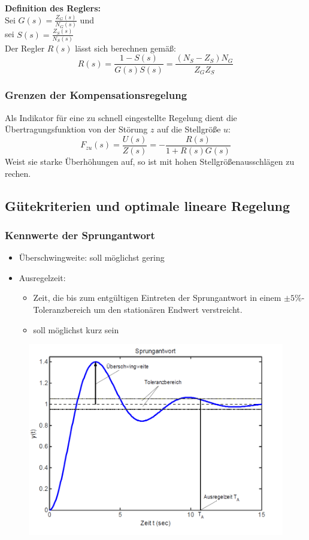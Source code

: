 \documentclass[10pt,a4paper]{article}
\begin{document}
\textbf{Definition des Reglers:} \\
Sei $G(s) = \frac{Z_G(s)}{N_G(s)}$ und \\
sei $S(s) = \frac{Z_S(s)}{N_S(s)}$ \\
Der Regler $R(s)$ lässt sich berechnen gemäß:
$$
	R(s) = \frac{1 - S(s)}{G(s)S(s)} = \frac{(N_S - Z_S)N_G}{Z_GZ_S}
$$

\subsubsection{Grenzen der Kompensationsregelung}
Als Indikator für eine zu schnell eingestellte Regelung dient die Übertragungsfunktion von der Störung $z$ auf die Stellgröße $u$:
$$
	F_{zu}(s) = \frac{U(s)}{Z(s)} = - \frac{R(s)}{1 + R(s) G(s)}
$$
Weist sie starke Überhöhungen auf, so ist mit hohen Stellgrößenausschlägen zu rechen.

\subsection{Gütekriterien und optimale lineare Regelung}
\subsubsection{Kennwerte der Sprungantwort}
\begin{itemize}
	\item Überschwingweite: soll möglichst gering
	\item Ausregelzeit: \begin{itemize}
		\item Zeit, die bis zum entgültigen Eintreten der Sprungantwort in einem $\pm 5 \%$-Toleranzbereich um den stationären Endwert verstreicht.
		\item soll möglichst kurz sein
	\end{itemize}
\end{itemize}
\begin{figure}[H]
	\includegraphics[width = 0.4\columnwidth]{imgs/sprungantwort_kennwerte.png}
\end{figure}
\end{document}
